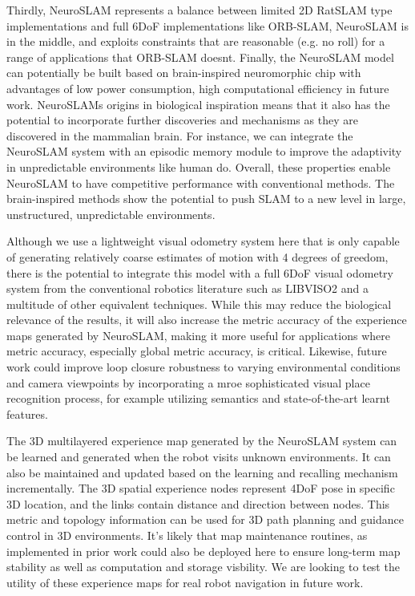 Thirdly, NeuroSLAM represents a balance between limited 2D RatSLAM type implementations and full 6DoF implementations like ORB-SLAM, NeuroSLAM is in the middle, and exploits constraints that are reasonable (e.g. no roll) for a range of applications that ORB-SLAM doesnt.
Finally, the NeuroSLAM model can potentially be built based on brain-inspired neuromorphic chip with advantages of low power consumption, high computational efficiency in future work.
NeuroSLAMs origins in biological inspiration means that it also has the potential to incorporate further discoveries and mechanisms as they are discovered in the mammalian brain.
For instance, we can integrate the NeuroSLAM system with an episodic memory module to improve the adaptivity in unpredictable environments like human do.
Overall, these properties enable NeuroSLAM to have competitive performance with conventional methods.
The brain-inspired methods show the potential to push SLAM to a new level in large, unstructured, unpredictable environments.


Although we use a lightweight visual odometry system here that is only capable of generating relatively coarse estimates of motion with 4 degrees of greedom, there is the potential to integrate this model with a full 6DoF visual odometry system from the conventional robotics literature such as LIBVISO2 and a multitude of other equivalent techniques.
While this may reduce the biological relevance of the results, it will also increase the metric accuracy of the experience maps generated by NeuroSLAM, making it more useful for applications where metric accuracy, especially global metric accuracy, is critical.
Likewise, future work could improve loop closure robustness to varying environmental conditions and camera viewpoints by incorporating a mroe sophisticated visual place recognition process, for example utilizing semantics and state-of-the-art learnt features.


The 3D multilayered experience map generated by the NeuroSLAM system can be learned and generated when the robot visits unknown environments.
It can also be maintained and updated based on the learning and recalling mechanism incrementally.
The 3D spatial experience nodes represent 4DoF pose in specific 3D location, and the links contain distance and direction between nodes.
This metric and topology information can be used for 3D path planning and guidance control in 3D environments.
It's likely that map maintenance routines, as implemented in prior work could also be deployed here to ensure long-term map stability as well as computation and storage visbility.
We are looking to test the utility of these experience maps for real robot navigation in future work.






















